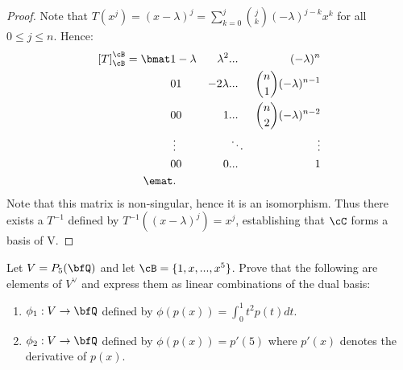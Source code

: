 \documentclass[10pt,twoside,openany]{memoir}
\begin{document}
        \begin{proof}
            Note that $T(x^j) = (x-\lambda)^j = \sum_{k=0}^j {j \choose k}(-\lambda)^{j-k} x^k$ for all $0 \leq j \leq n$. Hence:
            \begin{equation*}
                \begin{split}
                    \left[T\right]_\cB^\cB =
                    \bmat 
                    1 & -\lambda & \lambda^2 & ... & (-\lambda)^n  \\
                    0 & 1 &  -2\lambda & ... & {n \choose 1}(-\lambda)^{n-1}  \\
                    0 &  0 & 1 & ... & {n \choose 2}(-\lambda)^{n-2} \\
                    \vdots & & & \ddots & \vdots  \\
                    0 & 0 & 0 & ... & 1 \\
                    \emat.
                \end{split}
                \end{equation*}
            Note that this matrix is non-singular, hence it is an isomorphism. Thus there exists a $T^{-1}$ defined by $T^{-1}((x-\lambda)^j) = x^j$, establishing that $\cC$ forms a basis of V.
        \end{proof}
    \addtocounter{exercise}{2}
    \begin{exercise}
        Let $V = P_5(\bfQ)$ and let $\cB = \{1,x,...,x^5\}$. Prove that the following are elements of $V^\vee$ and express them as linear combinations of the dual basis:
            \begin{enumerate}[label = (\arabic*)]
                \item $\phi_1:V \rightarrow \bfQ$ defined by $\phi(p(x)) = \int_0^1 t^2p(t)dt$.
                \item $\phi_2:V \rightarrow \bfQ$ defined by $\phi(p(x)) = p'(5)$ where $p'(x)$ denotes the derivative of $p(x)$.
            \end{enumerate}
    \end{exercise}
\end{document}

